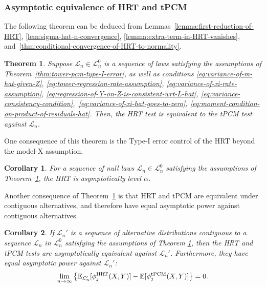 \documentclass[12pt]{article}
\newtheorem{theorem}{Theorem}
\newtheorem{corollary}{Corollary}
\theoremstyle{definition}
\theoremstyle{remark}
\newcommand{\E}{\mathbb E}								%
\newcommand{\srx}{X}									%
\newcommand{\sry}{Y}									%
\newcommand{\law}{\mathcal L}							%
\newcommand{\nulllaws}{\mathscr L^0}					%
\begin{document}
\subsubsection{Asymptotic equivalence of HRT and tPCM} \label{sec:asymptotic-equivalence-HRT-tPCM}

The following theorem can be deduced from Lemmas~\ref{lemma:first-reduction-of-HRT}, \ref{lem:sigma-hat-n-convergence}, \ref{lemma:extra-term-in-HRT-vanishes}, and~\ref{thm:conditional-convergence-of-HRT-to-normality}.

\begin{theorem}\label{thm:HRT-PCM-equivalence} Suppose $\law_n \in \nulllaws_n$ is a sequence of laws satisfying the assumptions of Theorem~\ref{thm:tower-pcm-type-I-error}, as well as conditions \eqref{eq:variance-of-m-hat-given-Z}, \eqref{eq:tower-regression-rate-assumption}, \eqref{eq:variance-of-xi-rate-assumption}, \eqref{eq:regression-of-Y-on-Z-is-consistent-wrt-L-hat}, \eqref{eq:variance-consistency-condition},~\eqref{eq:variance-of-xi-hat-goes-to-zero}, \eqref{eq:moment-condition-on-product-of-residuals-hat}. Then, the HRT test is equivalent to the tPCM  test against $\law_n$.
\end{theorem}

\noindent One consequence of this theorem is the Type-I error control of the HRT beyond the model-X assumption. 

\begin{corollary}
For a sequence of null laws $\law_n \in \nulllaws_n$ satisfying the assumptions of Theorem~\ref{thm:HRT-PCM-equivalence}, the HRT is asymptotically level $\alpha$.
\end{corollary}

\noindent Another consequence of Theorem~\ref{thm:HRT-PCM-equivalence} is that HRT and tPCM are equivalent under contiguous alternatives, and therefore have equal asymptotic power against contiguous alternatives. 

\begin{corollary}
	If $\law_n'$ is a sequence of alternative distributions contiguous to a sequence \( \law_n \) in \( \nulllaws_n \) satisfying the assumptions of Theorem \ref{thm:HRT-PCM-equivalence}, then the HRT and tPCM tests are asymptotically equivalent against \( \law_n' \). Furthermore, they have equal asymptotic power against $\law_n'$:
\begin{equation}
\lim _{n \rightarrow \infty}\left\{\E_{\law_n'}[\phi_j^{\textnormal{HRT}}(\srx, \sry)] - \E[\phi_j^{\textnormal{tPCM}}(\srx, \sry)]\right\} = 0.
\end{equation}
\end{corollary}
\end{document}
